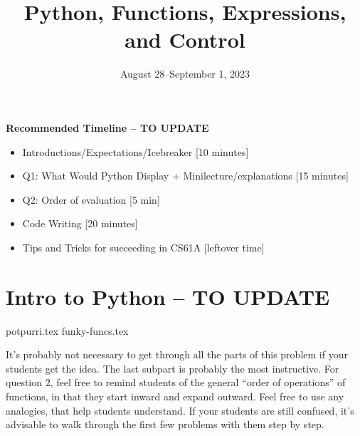 \documentclass{exam}
\title{Python, Functions, Expressions, and Control}
\date{August 28--September 1, 2023}
\begin{document}
\maketitle
\begin{meta}
\textbf{Recommended Timeline -- TO UPDATE}
\begin{itemize}
  \item Introductions/Expectations/Icebreaker [10 minutes]
  \item Q1: What Would Python Display + Minilecture/explanations [15 minutes]
  \item Q2: Order of evaluation [5 min]
  \item Code Writing [20 minutes]
  \item Tips and Tricks for succeeding in CS61A [leftover time]
\end{itemize}
\end{meta}


\section{Intro to Python -- TO UPDATE}
\begin{questions}
{potpurri.tex}
{funky-funcs.tex}
\begin{questionmeta}
  It's probably not necessary to get through all the parts of this problem if your students get the idea. The last subpart is probably the most instructive. 
  For question 2, feel free to remind students of the general ``order of operations'' of functions, in that they start inward and expand outward. Feel free to use any analogies, that help students understand.
  If your students are still confused, it's advisable to walk through the first few problems with them step by step.
\end{questionmeta}
\end{questions}
\end{document}
